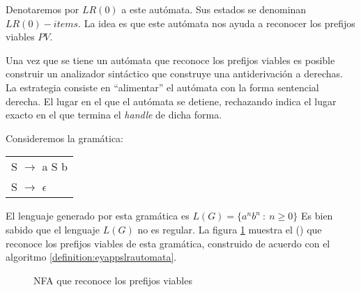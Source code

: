 Denotaremos por $LR(0)$ a este autómata. Sus estados se denominan $LR(0)-items$. La idea es que este
autómata nos ayuda a reconocer los prefijos viables $PV$.

Una vez que se tiene un autómata que reconoce los prefijos viables es posible construir un analizador sintáctico que construye una antiderivación a derechas. La estrategia consiste en ``alimentar'' el autómata con la forma sentencial derecha. El lugar en el que el autómata se detiene, rechazando indica el lugar exacto en el que termina el \emph{handle} de dicha forma.


\begin{example}
\label{example:eyappasb}
Consideremos la gramática:

\vspace{0.5cm}
\begin{center}
\begin{tabular}{l}
S      $\rightarrow$  a S b\\
S      $\rightarrow$ $\epsilon$ 
\end{tabular}
\end{center}
\vspace{0.25cm}

El lenguaje generado por esta gramática es $L(G) = \{ a^n b^n\ :\ n \ge 0 \}$
Es bien sabido que el lenguaje $L(G)$ no es regular.
La figura \ref{fig:eyappnfa} muestra 
el  
()
que reconoce los prefijos viables de esta gramática, construido
de acuerdo con el algoritmo \ref{definition:eyappslrautomata}.

\begin{center}
\begin{figure}[htb]
\label{fig:eyappnfa}
\centerline{}
\caption{NFA que reconoce los prefijos viables}
\end{figure}
\end{center}
\end{example}

